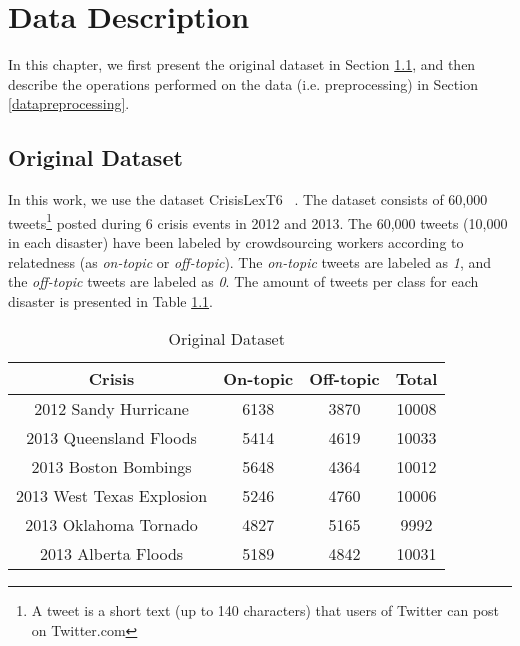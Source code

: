 \cleardoublepage

\chapter{Data Description}
\label{datadescription}

In this chapter, we first present the original dataset in Section \ref{originaldataset}, and then describe the operations performed on the data (i.e. preprocessing) in Section \ref{datapreprocessing}. 

\section{Original Dataset}
\label{originaldataset}

In this work, we use the dataset CrisisLexT6 ~\citep{data}. The dataset consists of 60,000 tweets\footnote{A tweet is a short text (up to 140 characters) that users of Twitter can post on Twitter.com} posted during 6 crisis events in 2012 and 2013. The 60,000 tweets (10,000 in each disaster) have been labeled by crowdsourcing workers according to relatedness (as \textit{on-topic} or \textit{off-topic}). The \textit{on-topic} tweets are labeled as \textit{1}, and the \textit{off-topic} tweets are labeled as \textit{0}. The amount of tweets per class for each disaster is presented in Table \ref{originaldatasettable}.

\begin{table}[ht]
    \begin{center}
    \caption{Original Dataset}
    \begin{tabular}[c]{|c|c|c|c|}
        \hline
        Crisis & On-topic & Off-topic & Total \\
        \hline
        2012 Sandy Hurricane & 6138 & 3870 & 10008 \\
        2013 Queensland Floods & 5414 & 4619 & 10033 \\ 
        2013 Boston Bombings & 5648 & 4364 & 10012 \\ 
        2013 West Texas Explosion & 5246 & 4760 & 10006 \\
        2013 Oklahoma Tornado & 4827 & 5165 & 9992 \\
        2013 Alberta Floods & 5189 & 4842 & 10031 \\
        \hline
    \end{tabular}
    \label{originaldatasettable}
   \end{center}
\end{table}


